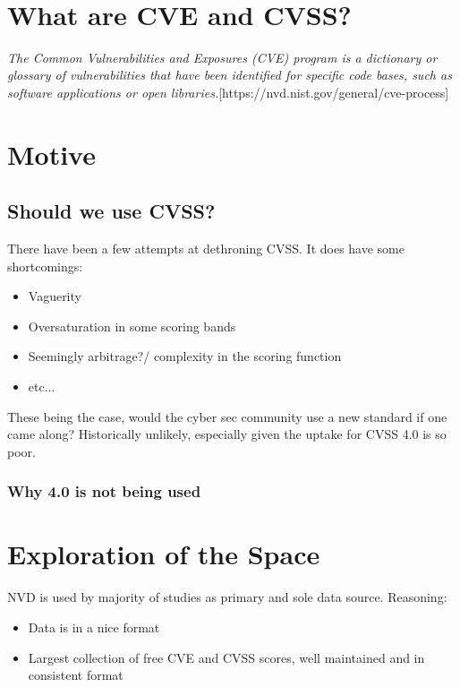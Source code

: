 \documentclass[11pt]{article}
\begin{document}
 \\

\section{What are CVE and CVSS?}

\textit{The Common Vulnerabilities and Exposures (CVE) program is a dictionary or glossary of
	vulnerabilities that have been identified for specific code bases, such as software applications or
	open libraries.}[https://nvd.nist.gov/general/cve-process]

\section{Motive}
\subsection{Should we use CVSS?}

There have been a few attempts at dethroning CVSS. It does have some shortcomings:

\begin{itemize}
	\item Vaguerity
	\item Oversaturation in some scoring bands
	\item Seemingly arbitrage?/ complexity in the scoring function
	\item etc...
\end{itemize}

These being the case, would the cyber sec community use a new standard if one came along?
Historically unlikely, especially given the uptake for CVSS 4.0 is so poor.

\subsubsection{Why 4.0 is not being used}
\section{Exploration of the Space}

NVD is used by majority of studies as primary and sole data source.
Reasoning:
\begin{itemize}
	\item Data is in a nice format
	\item Largest collection of free CVE and CVSS scores, well maintained and in consistent format
\end{itemize}
\end{document}
